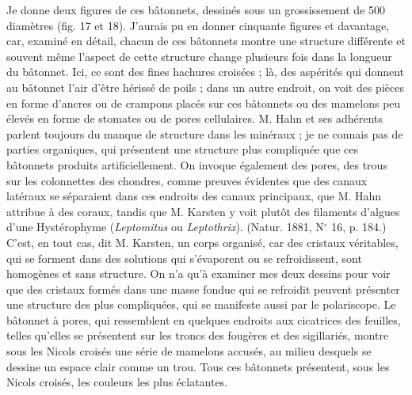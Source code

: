 \documentclass[a4paper, 12pt, oneside, french]{book}
\begin{document}
Je donne deux figures de ces bâtonnets, dessinés sous un grossissement de 500 diamètres (fig. 17 et 18). J'aurais pu en donner cinquante figures et davantage, car, examiné en détail, chacun de ces bâtonnets montre une structure différente et souvent même l'aspect de cette structure change plusieurs fois dans la longueur du bâtonnet. Ici, ce sont des fines hachures croisées ; là, des aspérités qui donnent au bâtonnet l'air d'être hérissé de poils ; dans un autre endroit, on voit des pièces en forme d'ancres ou de crampons placés sur ces bâtonnets ou des mamelons peu élevés en forme de stomates ou de pores cellulaires. M. Hahn et ses adhérents parlent toujours du \og manque de structure \fg dans les minéraux ; je ne connais pas de parties organiques, qui présentent une structure plus compliquée que ces bâtonnets produits artificiellement. On invoque également des pores, des trous sur les colonnettes des chondres, comme preuves évidentes que des canaux latéraux se séparaient dans ces endroits des canaux principaux, que M. Hahn attribue à des coraux, tandis que M. Karsten y voit plutôt des filaments d'algues d'une Hystérophyme (\emph{Leptomitus} ou \emph{Leptothrix}). (Natur. 1881, N$^{\circ}$ 16, p. 184.) \og C'est, en tout cas, dit M. Karsten, un corps organisé, car des cristaux véritables, qui se forment dans des solutions qui s'évaporent ou se refroidissent, sont homogènes et sans structure. \fg On n'a qu'à examiner mes deux dessins pour voir que des cristaux formés dans une masse fondue qui se refroidit peuvent présenter une structure des plus compliquées, qui se manifeste aussi par le polariscope. Le bâtonnet à pores, qui ressemblent en quelques endroits aux cicatrices des feuilles, telles qu'elles se présentent sur les troncs des fougères et des sigillariés, montre sous les Nicols croisés une série de mamelons accusés, au milieu desquels se dessine un espace clair comme un trou. Tous ces bâtonnets présentent, sous les Nicols croisés, les couleurs les plus éclatantes.
\end{document}
